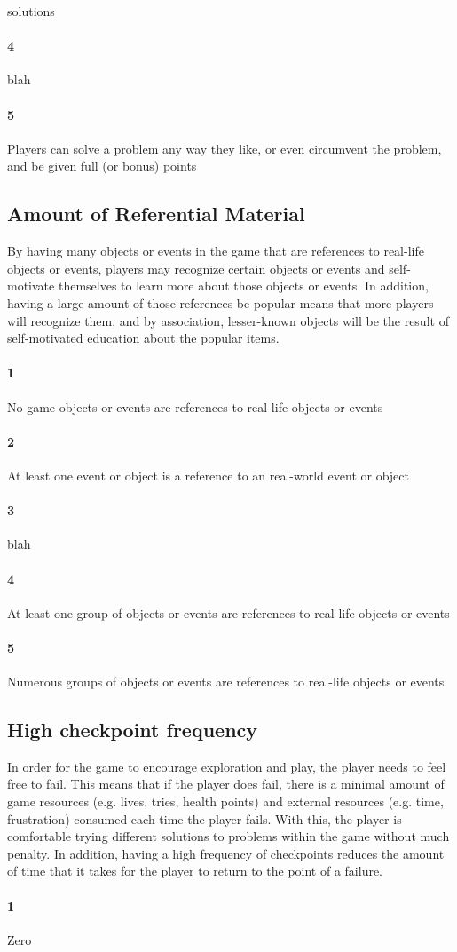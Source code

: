 solutions\paragraph{4}blah\paragraph{5}Players can solve a problem any way they like, or even circumvent the problem, and be given full (or bonus) points\subsection{Amount of Referential Material}{By having many objects or events in the game that are references to real-life objects or events, players may recognize certain objects or events and self-motivate themselves to learn more about those objects or events. In addition, having a large amount of those references be popular means that more players will recognize them, and by association, lesser-known objects will be the result of self-motivated education about the popular items.} \paragraph{1}No game objects or events are references to real-life objects or events\paragraph{2}At least one event or object is a reference to an real-world event or object\paragraph{3}blah\paragraph{4}At least one group of objects or events are references to real-life objects or events\paragraph{5}Numerous groups of objects or events are references to real-life objects or events\subsection{High checkpoint frequency}{In order for the game to encourage exploration and play, the player needs to feel free to fail. This means that if the player does fail, there is a minimal amount of game resources (e.g. lives, tries, health points) and external resources (e.g. time, frustration) consumed each time the player fails. With this, the player is comfortable trying different solutions to problems within the game without much penalty. In addition, having a high frequency of checkpoints reduces the amount of time that it takes for the player to return to the point of a failure.} \paragraph{1}Zero 